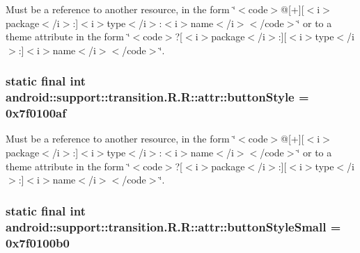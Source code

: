 Must be a reference to another resource, in the form \char`\"{}$<$code$>$@\mbox{[}+\mbox{]}\mbox{[}$<$i$>$package$<$/i$>$:\mbox{]}$<$i$>$type$<$/i$>$:$<$i$>$name$<$/i$>$$<$/code$>$\char`\"{} or to a theme attribute in the form \char`\"{}$<$code$>$?\mbox{[}$<$i$>$package$<$/i$>$:\mbox{]}\mbox{[}$<$i$>$type$<$/i$>$:\mbox{]}$<$i$>$name$<$/i$>$$<$/code$>$\char`\"{}. \hypertarget{classandroid_1_1support_1_1transition_1_1_r_1_1attr_6833dad0167aae7ee0298744a7061c57}{
\subsubsection[{buttonStyle}]{\setlength{\rightskip}{0pt plus 5cm}static final int android::support::transition.R.R::attr::buttonStyle = 0x7f0100af}}
\label{classandroid_1_1support_1_1transition_1_1_r_1_1attr_6833dad0167aae7ee0298744a7061c57}


Must be a reference to another resource, in the form \char`\"{}$<$code$>$@\mbox{[}+\mbox{]}\mbox{[}$<$i$>$package$<$/i$>$:\mbox{]}$<$i$>$type$<$/i$>$:$<$i$>$name$<$/i$>$$<$/code$>$\char`\"{} or to a theme attribute in the form \char`\"{}$<$code$>$?\mbox{[}$<$i$>$package$<$/i$>$:\mbox{]}\mbox{[}$<$i$>$type$<$/i$>$:\mbox{]}$<$i$>$name$<$/i$>$$<$/code$>$\char`\"{}. \hypertarget{classandroid_1_1support_1_1transition_1_1_r_1_1attr_202ffc35c063f8a693f6488f0a6696b0}{
\subsubsection[{buttonStyleSmall}]{\setlength{\rightskip}{0pt plus 5cm}static final int android::support::transition.R.R::attr::buttonStyleSmall = 0x7f0100b0}}
\label{classandroid_1_1support_1_1transition_1_1_r_1_1attr_202ffc35c063f8a693f6488f0a6696b0}


